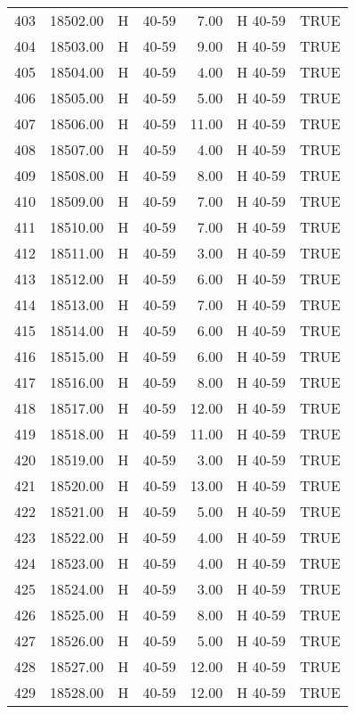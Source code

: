\begin{table}[ht]
\begin{tabular}{rrllrll}
  403 & 18502.00 & H & 40-59 & 7.00 & H 40-59 & TRUE \\ 
  404 & 18503.00 & H & 40-59 & 9.00 & H 40-59 & TRUE \\ 
  405 & 18504.00 & H & 40-59 & 4.00 & H 40-59 & TRUE \\ 
  406 & 18505.00 & H & 40-59 & 5.00 & H 40-59 & TRUE \\ 
  407 & 18506.00 & H & 40-59 & 11.00 & H 40-59 & TRUE \\ 
  408 & 18507.00 & H & 40-59 & 4.00 & H 40-59 & TRUE \\ 
  409 & 18508.00 & H & 40-59 & 8.00 & H 40-59 & TRUE \\ 
  410 & 18509.00 & H & 40-59 & 7.00 & H 40-59 & TRUE \\ 
  411 & 18510.00 & H & 40-59 & 7.00 & H 40-59 & TRUE \\ 
  412 & 18511.00 & H & 40-59 & 3.00 & H 40-59 & TRUE \\ 
  413 & 18512.00 & H & 40-59 & 6.00 & H 40-59 & TRUE \\ 
  414 & 18513.00 & H & 40-59 & 7.00 & H 40-59 & TRUE \\ 
  415 & 18514.00 & H & 40-59 & 6.00 & H 40-59 & TRUE \\ 
  416 & 18515.00 & H & 40-59 & 6.00 & H 40-59 & TRUE \\ 
  417 & 18516.00 & H & 40-59 & 8.00 & H 40-59 & TRUE \\ 
  418 & 18517.00 & H & 40-59 & 12.00 & H 40-59 & TRUE \\ 
  419 & 18518.00 & H & 40-59 & 11.00 & H 40-59 & TRUE \\ 
  420 & 18519.00 & H & 40-59 & 3.00 & H 40-59 & TRUE \\ 
  421 & 18520.00 & H & 40-59 & 13.00 & H 40-59 & TRUE \\ 
  422 & 18521.00 & H & 40-59 & 5.00 & H 40-59 & TRUE \\ 
  423 & 18522.00 & H & 40-59 & 4.00 & H 40-59 & TRUE \\ 
  424 & 18523.00 & H & 40-59 & 4.00 & H 40-59 & TRUE \\ 
  425 & 18524.00 & H & 40-59 & 3.00 & H 40-59 & TRUE \\ 
  426 & 18525.00 & H & 40-59 & 8.00 & H 40-59 & TRUE \\ 
  427 & 18526.00 & H & 40-59 & 5.00 & H 40-59 & TRUE \\ 
  428 & 18527.00 & H & 40-59 & 12.00 & H 40-59 & TRUE \\ 
  429 & 18528.00 & H & 40-59 & 12.00 & H 40-59 & TRUE \\ 

\end{tabular}
\end{table}
